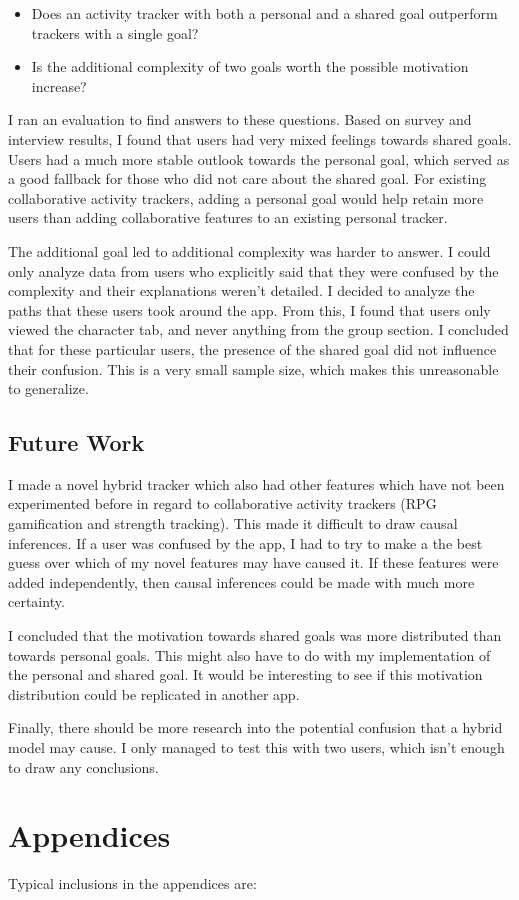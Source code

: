 \documentclass{l4proj}
\begin{document}
\begin{itemize}
  \item Does an activity tracker with both a personal and a shared goal outperform trackers with a single goal?
  \item Is the additional complexity of two goals worth the possible motivation increase?
\end{itemize}

I ran an evaluation to find answers to these questions. Based on survey and interview results, I found that users had very mixed feelings towards shared goals. Users had a much more stable outlook towards the personal goal, which served as a good fallback for those who did not care about the shared goal. For existing collaborative activity trackers, adding a personal goal would help retain more users than adding collaborative features to an existing personal tracker.

The additional goal led to additional complexity was harder to answer. I could only analyze data from users who explicitly said that they were confused by the complexity and their explanations weren't detailed. I decided to analyze the paths that these users took around the app. From this, I found that users only viewed the character tab, and never anything from the group section. I concluded that for these particular users, the presence of the shared goal did not influence their confusion. This is a very small sample size, which makes this unreasonable to generalize.

\section{Future Work}
I made a novel hybrid tracker which also had other features which have not been experimented before in regard to collaborative activity trackers (RPG gamification and strength tracking). This made it difficult to draw causal inferences. If a user was confused by the app, I had to try to make a the best guess over which of my novel features may have caused it. If these features were added independently, then causal inferences could be made with much more certainty. 

I concluded that the motivation towards shared goals was more distributed than towards personal goals. This might also have to do with my implementation of the personal and shared goal. It would be interesting to see if this motivation distribution could be replicated in another app.

Finally, there should be more research into the potential confusion that a hybrid model may cause. I only managed to test this with two users, which isn't enough to draw any conclusions.





\chapter{Appendices}


Typical inclusions in the appendices are:
\end{document}
